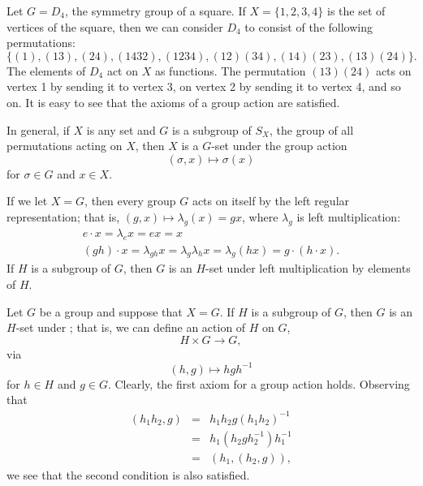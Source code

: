 \medskip

\begin{example}
Let $G = D_4$, the symmetry group of a square.  If $X = \{ 1, 2, 3, 4 \}$ is the set of vertices of the square, then we can consider $D_4$
to consist of the following permutations: 
$$
\{ (1), (13), (24), (1432), (1234), (12)(34), (14)(23), (13)(24) \}.
$$
The elements of $D_4$ act on $X$ as functions.  The permutation $(13)(24)$ acts on vertex 1 by sending it to vertex 3, on vertex 2 by
sending it to vertex 4, and so on.  It is easy to see that the  axioms of a group action are satisfied.
\mbox{\hspace{1in}}
\end{example}

\medskip

In general, if $X$ is any set and $G$ is a subgroup of $S_X$, the
group of all permutations acting on $X$, then $X$ is a $G$-set under
the group action 
$$
(\sigma, x) \mapsto \sigma(x)
$$
for $\sigma \in G$ and $x \in X$.
 
 
\medskip
 
 
\begin{example}
If we let $X = G$, then every group $G$ acts on itself by the left
regular representation; that is, $(g,x) \mapsto \lambda_g(x) = gx$, 
where  $\lambda_g$ is left multiplication:
$$
\begin{array}{c}
e \cdot x = \lambda_e x = ex = x \\
(gh) \cdot x = \lambda_{gh}x = \lambda_g \lambda_h x =
\lambda_g(hx) = g \cdot ( h \cdot x).
\end{array}
$$
If $H$ is a subgroup of $G$, then $G$ is an $H$-set under left
multiplication by elements of $H$. 
\end{example}
 
 
\medskip
 
 
\begin{example}
Let $G$ be a group and suppose that $X=G$. If $H$ is a subgroup of
$G$, then $G$ is an $H$-set under ; that is, we can define an action of
$H$ on $G$, 
$$
H \times G \rightarrow G,
$$
via
$$
(h,g) \mapsto hgh^{-1}
$$
for $h \in H$ and $g \in G$.  Clearly, the first axiom for a group
action holds.  Observing that 
\begin{eqnarray*}
(h_1 h_2, g) &=& h_1 h_2 g (h_1 h_2 )^{-1} \\
&=& h_1( h_2 g h_2^{-1}) h_1^{-1} \\
& = & (h_1, (h_2, g) ),
\end{eqnarray*}
we see that the second condition is also satisfied.
\end{example}
 
